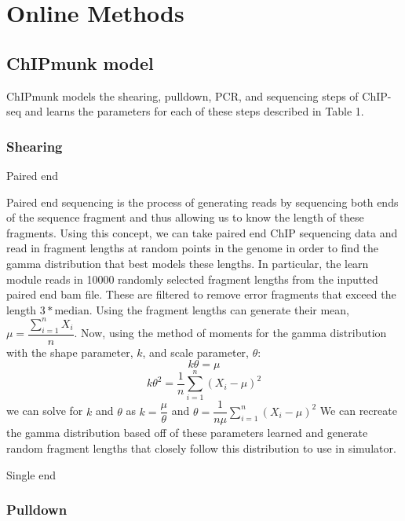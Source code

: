 \documentclass[12pt]{article}
\begin{document}
\section*{Online Methods}

\subsection*{ChIPmunk model}

ChIPmunk models the shearing, pulldown, PCR, and sequencing steps of ChIP-seq and learns the parameters for each of these steps described in Table 1. 

\subsubsection*{Shearing}

Paired end

Paired end sequencing is the process of generating reads by sequencing both ends of the sequence fragment and thus allowing us to know the length of these fragments. Using this concept, we can take paired end ChIP sequencing data and read in fragment lengths at random points in the genome in order to find the gamma distribution that best models these lengths. In particular, the learn module reads in 10000 randomly selected fragment lengths from the inputted paired end bam file. These are filtered to remove error fragments that exceed the length $3 * \text{median}$. Using the fragment lengths can generate their mean, $\mu = \dfrac{\sum_{i=1}^{n}X_i}{n}$. Now, using the method of moments for the gamma distribution with the shape parameter, $k$, and scale parameter, $\theta$: 
$$k\theta = \mu$$
$$k{\theta}^2 = \dfrac{1}{n}\sum_{i=1}^n(X_i - \mu)^2$$  
we can solve for $k$ and $\theta$ as $k = \dfrac{\mu}{\theta}$ and $\theta = \dfrac{1}{n\mu}\sum_{i=1}^{n}(X_i - \mu)^2$
We can recreate the gamma distribution based off of these parameters learned and generate random fragment lengths that closely follow this distribution to use in simulator.


Single end


\subsubsection*{Pulldown}
\end{document}
